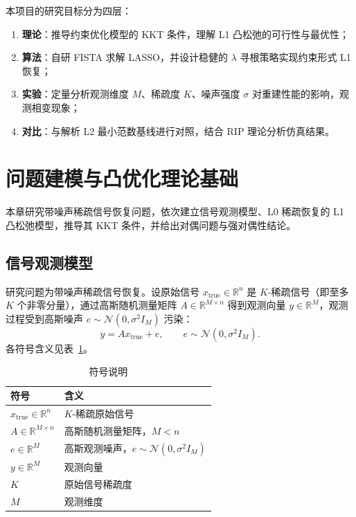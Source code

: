 \documentclass[UTF8]{ctexart}
\numberwithin{figure}{section}
\theoremstyle{definition}
\theoremstyle{examplestyle}
\theoremstyle{remark}
\begin{document}
本项目的研究目标分为四层：
\begin{enumerate}
\item \textbf{理论}：推导约束优化模型的 KKT 条件，理解 L1 凸松弛的可行性与最优性；
\item \textbf{算法}：自研 FISTA 求解 LASSO，并设计稳健的 $\lambda$ 寻根策略实现约束形式 L1 恢复；
\item \textbf{实验}：定量分析观测维度 $M$、稀疏度 $K$、噪声强度 $\sigma$ 对重建性能的影响，观测相变现象；
\item \textbf{对比}：与解析 L2 最小范数基线进行对照，结合 RIP 理论分析仿真结果。
\end{enumerate}

\section{问题建模与凸优化理论基础}
本章研究带噪声稀疏信号恢复问题，依次建立信号观测模型、L0 稀疏恢复的 L1 凸松弛模型，推导其 KKT 条件，并给出对偶问题与强对偶性结论。

\subsection{信号观测模型}
\label{sec:observation}

研究问题为带噪声稀疏信号恢复。设原始信号 $x_{\mathrm{true}}\in\mathbb{R}^n$ 是 $K$-稀疏信号（即至多 $K$ 个非零分量），通过高斯随机测量矩阵 $A\in\mathbb{R}^{M\times n}$ 得到观测向量 $y\in\mathbb{R}^M$，观测过程受到高斯噪声 $e\sim\mathcal{N}(0,\sigma^2 I_M)$ 污染：
\begin{equation}
\label{eq:observation}
y = A x_{\mathrm{true}} + e, \qquad e\sim\mathcal{N}(0,\sigma^2 I_M).
\end{equation}
各符号含义见表~\ref{tab:notation}。

\begin{table}[htbp]
\centering
\begin{tabular}{ll}
\hline
符号 & 含义 \\
\hline
$x_{\mathrm{true}}\in\mathbb{R}^n$ & $K$-稀疏原始信号 \\
$A\in\mathbb{R}^{M\times n}$ & 高斯随机测量矩阵，$M<n$ \\
$e\in\mathbb{R}^M$ & 高斯观测噪声，$e\sim\mathcal{N}(0,\sigma^2I_M)$ \\
$y\in\mathbb{R}^M$ & 观测向量 \\
$K$ & 原始信号稀疏度 \\
$M$ & 观测维度 \\
\hline
\end{tabular}
\caption{符号说明}
\label{tab:notation}
\end{table}
\end{document}
